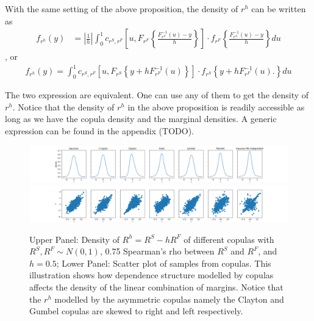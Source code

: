 \documentclass[square]{article} %
\theoremstyle{plain}
\theoremstyle{definition} %
\begin{document}
\begin{prop} With the same setting of the above proposition, the density of $r^h$ can be written as
  \begin{align}
  f_{r^h}(y) &= \left|\frac{1}{h}\right|\int_0^1 c_{r^S, r^F} \left[u,
  F_{r^F}\left\{\frac{F^{-1}_{r^S}(u)-y}{h}\right\}
  \right]
   \cdot
  f_{r^F}
  \left\{\frac{F^{-1}_{r^S}(u)-y}{h}\right\} du \label{eq:density1}
  \end{align}, or
    \begin{align}
      f_{r^h}(y)
      = \int_0^1 c_{r^S, r^F} \left[u,
      F_{r^S}\left\{y + h F^{-1}_{r^F}(u)\right\}
      \right]
       \cdot
      f_{r^S}
      \left\{
      y+ hF^{-1}_{r^F}(u).
      \right\} du\label{eq:density2}
  \end{align}
  \end{prop}
The two expression are equivalent.
One can use any of them to get the density of $r^h$.
Notice that the density of $r^h$ in the above proposition is readily accessible as long as we have
the copula density and the marginal densities.
A generic expression can be found in the appendix (TODO).
\begin{figure}[h]
\includegraphics[width=\textwidth]{_pics/density illustration1.png}
\includegraphics[width=\textwidth]{_pics/density illustration2.png}
  \caption{Upper Panel: Density of $R^h= R^S - hR^F$ of different copulas with
  $R^S, R^F \sim N(0,1)$,
  0.75 Spearman's rho between $R^S$ and $R^F$, and $h=0.5$;
  Lower Panel: Scatter plot of samples from copulas.
  This illustration shows how dependence structure modelled by copulas affects the density of the linear combination
  of margins.
  Notice that the $r^h$ modelled by the asymmetric copulas namely the Clayton and Gumbel copulas are skewed to right
  and left respectively.}
\label{fig:density illustration}
\end{figure}
\end{document}
